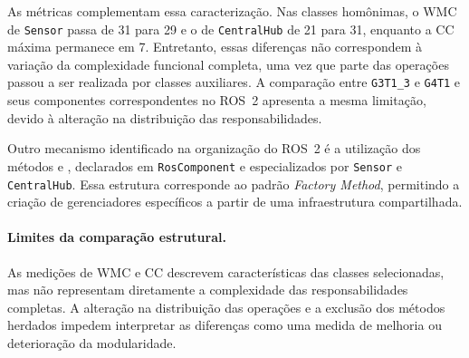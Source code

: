 As métricas complementam essa caracterização. Nas classes homônimas, o WMC de \texttt{Sensor} passa de 31 para 29 e o de \texttt{CentralHub} de 21 para 31, enquanto a CC máxima permanece em 7. Entretanto, essas diferenças não correspondem à variação da complexidade funcional completa, uma vez que parte das operações passou a ser realizada por classes auxiliares. A comparação entre \texttt{G3T1\_3} e \texttt{G4T1} e seus componentes correspondentes no ROS~2 apresenta a mesma limitação, devido à alteração na distribuição das responsabilidades.

Outro mecanismo identificado na organização do ROS~2 é a utilização dos métodos  e , declarados em \texttt{RosComponent} e especializados por \texttt{Sensor} e \texttt{CentralHub}. Essa estrutura corresponde ao padrão \textit{Factory Method}, permitindo a criação de gerenciadores específicos a partir de uma infraestrutura compartilhada.

\paragraph{Limites da comparação estrutural.}

As medições de WMC e CC descrevem características das classes selecionadas, mas não representam diretamente a complexidade das responsabilidades completas. A alteração na distribuição das operações e a exclusão dos métodos herdados impedem interpretar as diferenças como uma medida de melhoria ou deterioração da modularidade.

